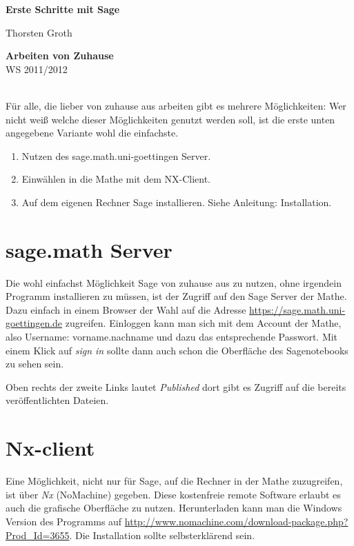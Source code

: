 \documentclass[a4paper,10pt,DIV15]{scrartcl}
\begin{document}

\begin{center}
\textbf{\LARGE Erste Schritte mit Sage}\\
\end{center}
\begin{minipage}{6cm}
Thorsten Groth
\end{minipage}\hfill
\begin{minipage}{2.5cm}
\begin{flushright}
\textbf{Arbeiten von Zuhause}\\
WS 2011/2012
\end{flushright}
\end{minipage}\\[1cm]


Für alle, die lieber von zuhause aus arbeiten gibt es mehrere Möglichkeiten: Wer nicht weiß welche dieser Möglichkeiten genutzt werden soll, ist 
die erste unten angegebene Variante wohl die einfachste.
\begin{enumerate}
 \item Nutzen des sage.math.uni-goettingen Server. 
 \item Einwählen in die Mathe mit dem NX-Client. 
 \item Auf dem eigenen Rechner Sage installieren. Siehe Anleitung: Installation.
\end{enumerate}

\section{sage.math Server}
Die wohl einfachst Möglichkeit Sage von zuhause aus zu nutzen, ohne irgendein Programm installieren zu müssen, ist der Zugriff auf den Sage Server 
der Mathe. Dazu einfach in einem Browser der Wahl auf die Adresse \url{https://sage.math.uni-goettingen.de} zugreifen. Einloggen kann man sich mit
dem Account der Mathe, also Username: vorname.nachname und dazu das entsprechende Passwort. Mit einem Klick auf \emph{sign in} sollte dann auch
schon die Oberfläche des Sagenotebooks zu sehen sein. 

Oben rechts der zweite Links lautet \emph{Published} dort gibt es Zugriff auf die bereits veröffentlichten Dateien.

\section{Nx-client}
Eine Möglichkeit, nicht nur für Sage, auf die Rechner in der Mathe zuzugreifen, ist über \emph{Nx} (NoMachine) gegeben. Diese kostenfreie 
remote Software erlaubt es auch die grafische Oberfläche zu nutzen. 
Herunterladen kann man die Windows Version des Programms auf 
\url{http://www.nomachine.com/download-package.php?Prod_Id=3655}. Die Installation
sollte selbsterklärend sein. 
\end{document}
